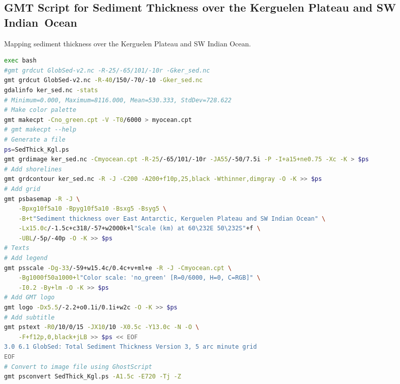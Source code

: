 \documentclass[geomatics,article,accept,pdftex,moreauthors]{Definitions/mdpi}
\begin{document}
\subsection[\appendixname~\thesubsection]{GMT Script for Sediment Thickness over the Kerguelen Plateau and SW Indian~Ocean}
\vspace{-9pt}
\begin{listing}[H]
\caption{Mapping sediment thickness over the Kerguelen Plateau and SW Indian Ocean.}
\label{lst06}
\begin{lstlisting}[xleftmargin=10pt,xrightmargin=3.5pt ,language=bash,caption={}]
exec bash
#gmt grdcut GlobSed-v2.nc -R-25/-65/101/-10r -Gker_sed.nc
gmt grdcut GlobSed-v2.nc -R-40/150/-70/-10 -Gker_sed.nc
gdalinfo ker_sed.nc -stats
# Minimum=0.000, Maximum=8116.000, Mean=530.333, StdDev=728.622
# Make color palette
gmt makecpt -Cno_green.cpt -V -T0/6000 > myocean.cpt
# gmt makecpt --help
# Generate a file
ps=SedThick_Kgl.ps
gmt grdimage ker_sed.nc -Cmyocean.cpt -R-25/-65/101/-10r -JA55/-50/7.5i -P -I+a15+ne0.75 -Xc -K > $ps
# Add shorelines
gmt grdcontour ker_sed.nc -R -J -C200 -A200+f10p,25,black -Wthinner,dimgray -O -K >> $ps
# Add grid
gmt psbasemap -R -J \
    -Bpxg10f5a10 -Bpyg10f5a10 -Bsxg5 -Bsyg5 \
    -B+t"Sediment thickness over East Antarctic, Kerguelen Plateau and SW Indian Ocean" \
    -Lx15.0c/-1.5c+c318/-57+w2000k+l"Scale (km) at 60\232E 50\232S"+f \
    -UBL/-5p/-40p -O -K >> $ps
# Texts
# Add legend
gmt psscale -Dg-33/-59+w15.4c/0.4c+v+ml+e -R -J -Cmyocean.cpt \
    -Bg1000f50a1000+l"Color scale: 'no_green' [R=0/6000, H=0, C=RGB]" \
    -I0.2 -By+lm -O -K >> $ps
# Add GMT logo
gmt logo -Dx5.5/-2.2+o0.1i/0.1i+w2c -O -K >> $ps
# Add subtitle
gmt pstext -R0/10/0/15 -JX10/10 -X0.5c -Y13.0c -N -O \
    -F+f12p,0,black+jLB >> $ps << EOF
3.0 6.1 GlobSed: Total Sediment Thickness Version 3, 5 arc minute grid
EOF
# Convert to image file using GhostScript
gmt psconvert SedThick_Kgl.ps -A1.5c -E720 -Tj -Z
\end{lstlisting}
\end{listing}
\end{document}
